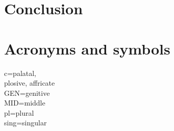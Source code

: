 \documentclass[11pt,a4paper]{article}
\begin{document}
	
	\section{Conclusion}
	
	\newpage
	
	
	
	\newpage
	\section*{Acronyms and symbols}
	c=palatal,\\
	plosive, affricate\\
	GEN=genitive\\
	MID=middle\\
	pl=plural\\
	sing=singular\\
	
\end{document}
